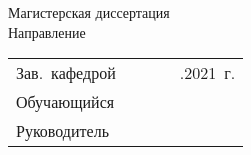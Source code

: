 \thispagestyle{empty}
\begin{center}
\thesisOrganization
\end{center}

%
\vspace{0pt plus1fill} %
\begin{center}
{\thesisFacultyTitle} \\
{\thesisCafedrTitle} \\
\end{center}
%
\vspace{0pt plus8fill} %
\begin{center}
\textbf { %
\thesisTitle}

{%
\vspace{0pt plus1fill}
Магистерская диссертация \\
Направление \thesisSpecialtyNumber \space
\thesisSpecialtyTitle \\
\thesisProfile  
}

\vspace{0pt plus4fill} %
\end{center}
%
\vspace{0pt plus12fill} %
\begin{flushright}
	\begin{tabular}{lclll}
		Зав.~кафедрой 	& \underline{\hspace{2.4cm}} 	& \genCafedraRegaliaShort 	& \genCafedraFIOShort 	& \underline{\hspace{0.7cm}}.\underline{\hspace{0.7cm}}2021~г.	\\
		Обучающийся 	& \underline{\hspace{2.4cm}} 	&   						& \thesisAuthorShort 	& 						\\
		Руководитель 	& \underline{\hspace{2.4cm}} 	& \genCafedraRegaliaShort 	& \genCafedraFIOShort 	&						\\
	\end{tabular}
	
\end{flushright}
%
\vspace{0pt plus8fill} %
{\centering\thesisCity~\thesisYear\par}
